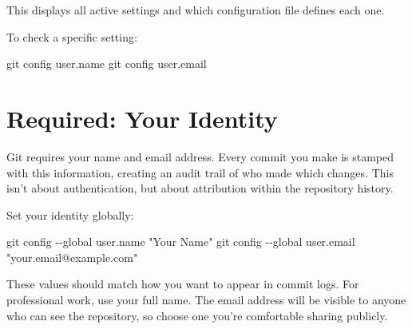 \documentclass[
  letterpaper,
  DIV=11,
  numbers=noendperiod]{scrreprt}
\newenvironment{Shaded}{\begin{snugshade}}{\end{snugshade}}
\newcommand{\AttributeTok}[1]{\textcolor[rgb]{0.40,0.45,0.13}{#1}}
\newcommand{\FunctionTok}[1]{\textcolor[rgb]{0.28,0.35,0.67}{#1}}
\newcommand{\NormalTok}[1]{\textcolor[rgb]{0.00,0.23,0.31}{#1}}
\newcommand{\StringTok}[1]{\textcolor[rgb]{0.13,0.47,0.30}{#1}}
\begin{document}
This displays all active settings and which configuration file defines
each one.

To check a specific setting:

\begin{codelisting}

\caption{\texttt{terminal}}

\begin{Shaded}
\begin{Highlighting}[]
\FunctionTok{git}\NormalTok{ config user.name}
\FunctionTok{git}\NormalTok{ config user.email}
\end{Highlighting}
\end{Shaded}

\end{codelisting}

\section{Required: Your Identity}\label{required-your-identity}

Git requires your name and email address. Every commit you make is
stamped with this information, creating an audit trail of who made which
changes. This isn't about authentication, but about attribution within
the repository history.

Set your identity globally:

\begin{codelisting}

\caption{\texttt{terminal}}

\begin{Shaded}
\begin{Highlighting}[]
\FunctionTok{git}\NormalTok{ config }\AttributeTok{{-}{-}global}\NormalTok{ user.name }\StringTok{"Your Name"}
\FunctionTok{git}\NormalTok{ config }\AttributeTok{{-}{-}global}\NormalTok{ user.email }\StringTok{"your.email@example.com"}
\end{Highlighting}
\end{Shaded}

\end{codelisting}

These values should match how you want to appear in commit logs. For
professional work, use your full name. The email address will be visible
to anyone who can see the repository, so choose one you're comfortable
sharing publicly.
\end{document}
